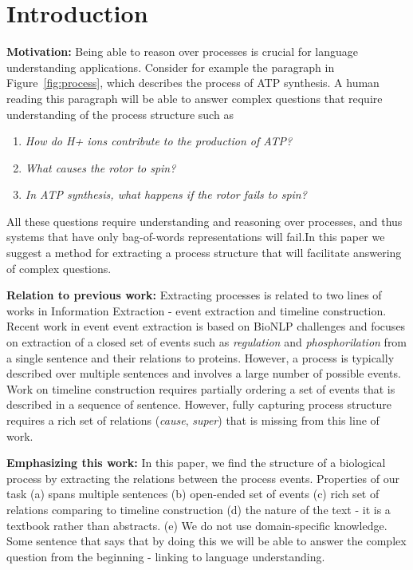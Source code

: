 \section{Introduction}

\textbf{Motivation:} Being able to reason over processes is crucial for language understanding applications. Consider for example the paragraph in Figure~\ref{fig:process}, which describes the process of ATP synthesis. A human reading this paragraph will be able to answer complex questions that require understanding of the process structure such as

\begin{enumerate}
\item \emph{How do H+ ions contribute to the production of ATP?}
\item \emph{What causes the rotor to spin?}
\item \emph{In ATP synthesis, what happens if the rotor fails to spin?}
\end{enumerate}

\noindent All these questions require understanding and reasoning over processes, and thus systems that have only bag-of-words representations will fail.In this paper we suggest a method for extracting a process structure that will facilitate answering of complex questions.


\textbf{Relation to previous work:} 
Extracting processes is related to two lines of works in Information Extraction - event extraction and timeline construction. Recent work in event event extraction \cite{riedel11fast,Mcclosky11} is based on BioNLP challenges and focuses on extraction of a closed set of events such as \emph{regulation} and \emph{phosphorilation} from a single sentence and their relations to proteins. However, a process is typically described over multiple sentences and involves a large number of possible events. Work on timeline construction \cite{Do12,Mcclosky12} requires partially ordering a set of events that is described in a sequence of sentence. However, fully capturing process structure requires a rich set of relations (\emph{cause}, \emph{super}) that is missing from this line of work.

\textbf{Emphasizing this work:} In this paper, we find the structure of a biological process by extracting the relations between the process events. Properties of our task (a) spans multiple sentences (b) open-ended set of events (c) rich set of relations comparing to timeline construction (d) the nature of the text - it is a textbook rather than abstracts. (e) We do not use domain-specific knowledge. Some sentence that says that by doing this we will be able to answer the complex question from the beginning - linking to language understanding.

